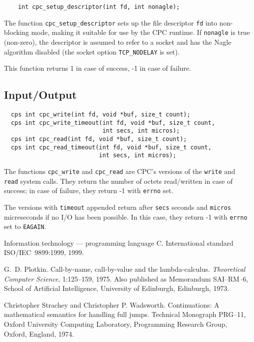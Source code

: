 \documentclass[a4paper]{report}
\begin{document}
\begin{verbatim}
    int cpc_setup_descriptor(int fd, int nonagle);
\end{verbatim}

The function \verb|cpc_setup_descriptor| sets up the file descriptor
\verb|fd| into non-blocking mode, making it suitable for use by the
CPC runtime.  If \verb|nonagle| is true (non-zero), the descriptor is
assumed to refer to a socket and has the Nagle algorithm disabled (the
socket option \verb|TCP_NODELAY| is set).

This function returns 1 in case of success, -1 in case of failure.

\subsection{Input/Output}
\begin{verbatim}
  cps int cpc_write(int fd, void *buf, size_t count);
  cps int cpc_write_timeout(int fd, void *buf, size_t count,
                            int secs, int micros);
  cps int cpc_read(int fd, void *buf, size_t count);
  cps int cpc_read_timeout(int fd, void *buf, size_t count,
                           int secs, int micros);
\end{verbatim}

The functions \verb|cpc_write| and \verb|cpc_read| are CPC's versions
of the \verb|write| and \verb|read| system calls.  They return the
number of octets read/written in case of success; in case of failure,
they return -1 with \verb|errno| set.

The versions with \verb|timeout| appended return after \verb|secs|
seconds and \verb|micros| micreseconds if no I/O has been possible.
In this case, they return -1 with \verb|errno| set to \verb|EAGAIN|.

\begin{thebibliography}{MTHM90}

Information technology --- programming language {C}.
International standard ISO/IEC~9899:1999, 1999.

G.~D. Plotkin.
Call-by-name, call-by-value and the lambda-calculus.
{\em Theoretical Computer Science}, 1:125--159, 1975.
Also published as Memorandum SAI--RM--6, School of Artificial
  Intelligence, University of Edinburgh, Edinburgh, 1973.

Christopher Strachey and Christopher P. Wadsworth.
Continuations: A mathematical semantics for handling full jumps.
Technical Monograph PRG--11, Oxford University Computing
Laboratory, Programming Research Group, Oxford, England, 1974.

\end{thebibliography}
\end{document}
